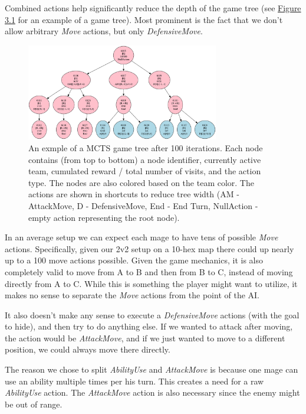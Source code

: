 Combined actions help significantly reduce the depth of the game tree (see \hyperref[fig:gametree]{Figure 3.1} for an example of a game tree). Most
prominent is the fact that we don't allow arbitrary \emph{Move} actions, but
only \emph{DefensiveMove}.


\begin{figure}
	\centering
	\includegraphics[width=0.75\textwidth]{img/game-tree.png}
	\caption{An exmple of a MCTS game tree after 100 iterations. Each node contains (from top to bottom) a node identifier, currently active team, cumulated reward / total number of visits, and the action type. The nodes are also colored based on the team color. The actions are shown in shortcuts to reduce tree width (AM - AttackMove, D - DefensiveMove, End - End Turn, NullAction - empty action representing the root node).}
	\label{fig:gametree}	
\end{figure}


In an average setup we can expect each mage to have tens of possible
\emph{Move} actions. Specifically, given our 2v2 setup on a 10-hex map there
could up nearly up to a 100 move actions possible. Given the game mechanics, it
is also completely valid to move from A to B and then from B to C, instead of
moving directly from A to C. While this is something the player might want to
utilize, it makes no sense to separate the \emph{Move} actions from the point
of the AI\@.

It also doesn't make any sense to execute a \emph{DefensiveMove} actions (with
the goal to hide), and then try to do anything else. If we wanted to attack
after moving, the action would be \emph{AttackMove}, and if we just wanted to
move to a different position, we could always move there directly.

The reason we chose to split \emph{AbilityUse} and \emph{AttackMove} is because one
mage can use an ability multiple times per his turn. This creates a need for a raw
\emph{AbilityUse} action. The \emph{AttackMove} action is also necessary since the enemy
might be out of range.

